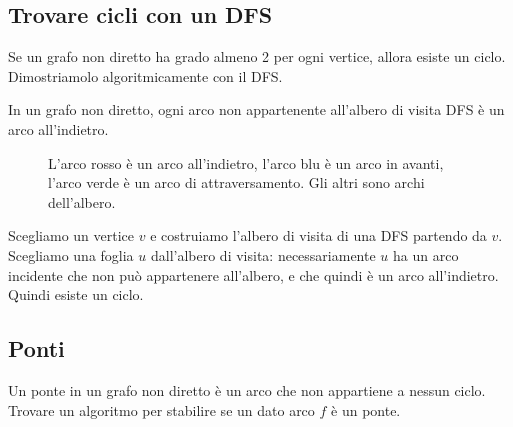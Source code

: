\clearpage

\subsection{Trovare cicli con un DFS}

\begin{esercizio}
Se un grafo non diretto ha grado almeno 2 per ogni vertice, allora esiste un ciclo. Dimostriamolo algoritmicamente con il DFS.
\end{esercizio}

In un grafo non diretto, ogni arco non appartenente all'albero di visita DFS \`e un arco all'indietro.

\begin{figure}
\centering
{}
\caption{L'arco rosso \`e un arco all'indietro, l'arco blu \`e un arco in avanti, l'arco verde \`e un arco di attraversamento. Gli altri sono archi dell'albero.}
\end{figure}

Scegliamo un vertice $v$ e costruiamo l'albero di visita di una DFS partendo da $v$. Scegliamo una foglia $u$ dall'albero di visita: necessariamente $u$ ha un arco incidente che non pu\`o appartenere all'albero, e che quindi \`e un arco all'indietro. Quindi esiste un ciclo.

\clearpage

\subsection{Ponti}
 
\begin{esercizio}
Un ponte in un grafo non diretto \`e un arco che non appartiene a nessun ciclo. Trovare un algoritmo per stabilire se un dato arco $f$ \`e un ponte.
\end{esercizio}

